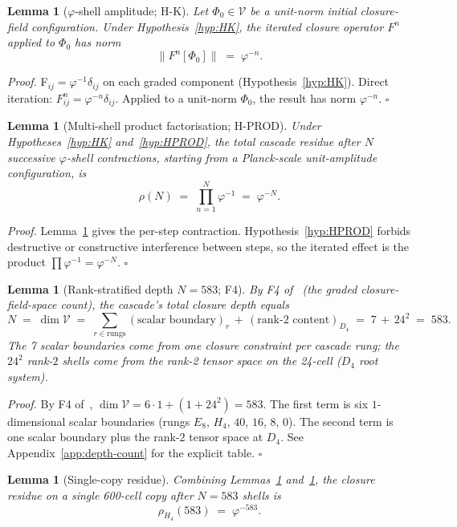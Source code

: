 \documentclass[11pt]{article}
\theoremstyle{plain}
\newtheorem{lemma}[theorem]{Lemma}
\theoremstyle{definition}
\theoremstyle{remark}
\newcommand{\Vcal}{\mathcal{V}}
\begin{document}
\begin{lemma}[$\varphi$-shell amplitude; H-K]\label{lem:phi-shell}
Let $\Phi_0 \in \Vcal$ be a unit-norm initial closure-field configuration. Under Hypothesis~\ref{hyp:HK}, the iterated closure operator $F^n$ applied to $\Phi_0$ has norm
\[
  \|F^n[\Phi_0]\| \;=\; \varphi^{-n}.
\]
\end{lemma}

\noindent\emph{Proof.} F$_{ij} = \varphi^{-1}\delta_{ij}$ on each graded component (Hypothesis~\ref{hyp:HK}). Direct iteration: $F^n_{ij} = \varphi^{-n}\delta_{ij}$. Applied to a unit-norm $\Phi_0$, the result has norm $\varphi^{-n}$. \hfill$\square$

\begin{lemma}[Multi-shell product factorisation; H-PROD]\label{lem:multi-shell}
Under Hypotheses~\ref{hyp:HK} and~\ref{hyp:HPROD}, the total cascade residue after $N$ successive $\varphi$-shell contractions, starting from a Planck-scale unit-amplitude configuration, is
\[
  \rho(N) \;=\; \prod_{n=1}^{N} \varphi^{-1} \;=\; \varphi^{-N}.
\]
\end{lemma}

\noindent\emph{Proof.} Lemma~\ref{lem:phi-shell} gives the per-step contraction. Hypothesis~\ref{hyp:HPROD} forbids destructive or constructive interference between steps, so the iterated effect is the product $\prod \varphi^{-1} = \varphi^{-N}$. \hfill$\square$

\begin{lemma}[Rank-stratified depth $N = 583$; F4]\label{lem:depth-583}
By F4 of~\citet{SmartXXXVI} (the graded closure-field-space count), the cascade's total closure depth equals
\[
  N \;=\; \dim \Vcal \;=\; \sum_{r \in \mathrm{rungs}} (\text{scalar boundary})_r \,+\, (\text{rank-}2\text{ content})_{D_4} \;=\; 7 \,+\, 24^2 \;=\; 583.
\]
The 7 scalar boundaries come from one closure constraint per cascade rung; the $24^2$ rank-$2$ shells come from the rank-2 tensor space on the 24-cell ($D_4$ root system).
\end{lemma}

\noindent\emph{Proof.} By F4 of~\citet{SmartXXXVI}, $\dim \Vcal = 6 \cdot 1 + (1 + 24^2) = 583$. The first term is six $1$-dimensional scalar boundaries (rungs $E_8$, $H_4$, $40$, $16$, $8$, $0$). The second term is one scalar boundary plus the rank-$2$ tensor space at $D_4$. See Appendix~\ref{app:depth-count} for the explicit table. \hfill$\square$

\begin{lemma}[Single-copy residue]\label{lem:single-copy}
Combining Lemmas~\ref{lem:multi-shell} and~\ref{lem:depth-583}, the closure residue on a single 600-cell copy after $N = 583$ shells is
\[
  \rho_{H_4}(583) \;=\; \varphi^{-583}.
\]
\end{lemma}
\end{document}
